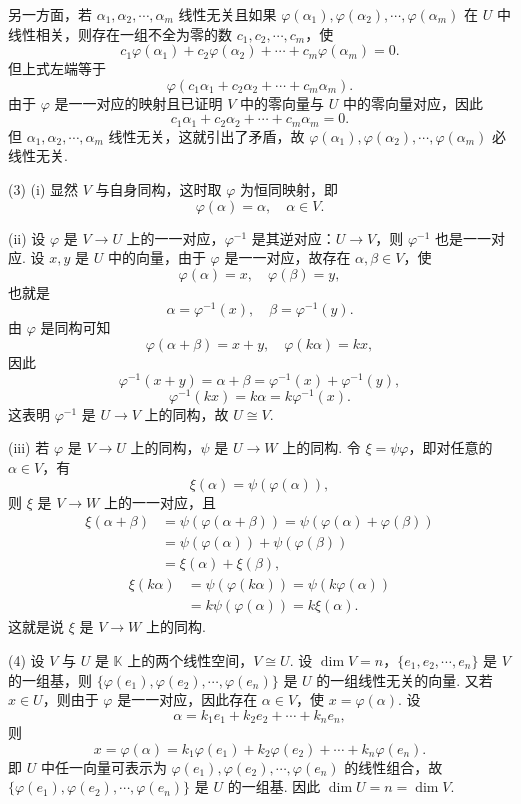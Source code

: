 \documentclass[UTF8,12pt,a4paper,fontset=fandol]{ctexart}
\begin{document}
另一方面，若 $\alpha_1,\alpha_2,\cdots,\alpha_m$ 线性无关且如果 $\varphi(\alpha_1),\varphi(\alpha_2),\cdots,\varphi(\alpha_m)$ 在 $U$ 中线性相关，则存在一组不全为零的数 $c_1,c_2,\cdots,c_m$，使
\[
c_1\varphi(\alpha_1)+c_2\varphi(\alpha_2)+\cdots+c_m\varphi(\alpha_m)=0.
\]
但上式左端等于
\[
\varphi(c_1\alpha_1+c_2\alpha_2+\cdots+c_m\alpha_m).
\]
由于 $\varphi$ 是一一对应的映射且已证明 $V$ 中的零向量与 $U$ 中的零向量对应，因此
\[
c_1\alpha_1+c_2\alpha_2+\cdots+c_m\alpha_m=0.
\]
但 $\alpha_1,\alpha_2,\cdots,\alpha_m$ 线性无关，这就引出了矛盾，故 $\varphi(\alpha_1),\varphi(\alpha_2),\cdots,\varphi(\alpha_m)$ 必线性无关.

(3) (i) 显然 $V$ 与自身同构，这时取 $\varphi$ 为恒同映射，即
\[
\varphi(\alpha)=\alpha,\quad \alpha\in V.
\]

(ii) 设 $\varphi$ 是 $V\to U$ 上的一一对应，$\varphi^{-1}$ 是其逆对应：$U\to V$，则 $\varphi^{-1}$ 也是一一对应. 设 $x,y$ 是 $U$ 中的向量，由于 $\varphi$ 是一一对应，故存在 $\alpha,\beta\in V$，使
\[
\varphi(\alpha)=x,\quad \varphi(\beta)=y,
\]
也就是
\[
\alpha=\varphi^{-1}(x),\quad \beta=\varphi^{-1}(y).
\]
由 $\varphi$ 是同构可知
\[
\varphi(\alpha+\beta)=x+y,\quad \varphi(k\alpha)=kx,
\]
因此
\[
\varphi^{-1}(x+y)=\alpha+\beta=\varphi^{-1}(x)+\varphi^{-1}(y),
\]
\[
\varphi^{-1}(kx)=k\alpha=k\varphi^{-1}(x).
\]
这表明 $\varphi^{-1}$ 是 $U\to V$ 上的同构，故 $U\cong V$.

(iii) 若 $\varphi$ 是 $V\to U$ 上的同构，$\psi$ 是 $U\to W$ 上的同构. 令 $\xi=\psi\varphi$，即对任意的 $\alpha\in V$，有
\[
\xi(\alpha)=\psi(\varphi(\alpha)),
\]
则 $\xi$ 是 $V\to W$ 上的一一对应，且
\[
\begin{aligned}
\xi(\alpha+\beta)&=\psi(\varphi(\alpha+\beta))=\psi(\varphi(\alpha)+\varphi(\beta))\\
&=\psi(\varphi(\alpha))+\psi(\varphi(\beta))\\
&=\xi(\alpha)+\xi(\beta),
\end{aligned}
\]
\[
\begin{aligned}
\xi(k\alpha)&=\psi(\varphi(k\alpha))=\psi(k\varphi(\alpha))\\
&=k\psi(\varphi(\alpha))=k\xi(\alpha).
\end{aligned}
\]
这就是说 $\xi$ 是 $V\to W$ 上的同构.

(4) 设 $V$ 与 $U$ 是 $\mathbb{K}$ 上的两个线性空间，$V\cong U$. 设 $\dim V=n$，$\{e_1,e_2,\cdots,e_n\}$ 是 $V$ 的一组基，则 $\{\varphi(e_1),\varphi(e_2),\cdots,\varphi(e_n)\}$ 是 $U$ 的一组线性无关的向量. 又若 $x\in U$，则由于 $\varphi$ 是一一对应，因此存在 $\alpha\in V$，使 $x=\varphi(\alpha)$. 设
\[
\alpha=k_1e_1+k_2e_2+\cdots+k_ne_n,
\]
则
\[
x=\varphi(\alpha)=k_1\varphi(e_1)+k_2\varphi(e_2)+\cdots+k_n\varphi(e_n).
\]
即 $U$ 中任一向量可表示为 $\varphi(e_1),\varphi(e_2),\cdots,\varphi(e_n)$ 的线性组合，故 $\{\varphi(e_1),\varphi(e_2),\cdots,\varphi(e_n)\}$ 是 $U$ 的一组基. 因此 $\dim U=n=\dim V$.
\end{document}
